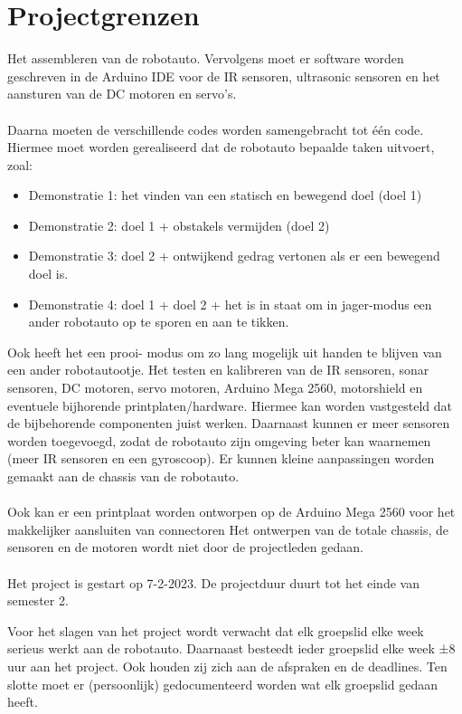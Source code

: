 \section{Projectgrenzen}
Het assembleren van de robotauto. Vervolgens moet er software worden geschreven in de Arduino IDE voor de IR sensoren, ultrasonic sensoren en het aansturen van de DC motoren en servo’s.
\\\\
Daarna moeten de verschillende codes worden samengebracht tot één code. Hiermee moet worden gerealiseerd dat de robotauto bepaalde taken uitvoert, zoal:

\begin{itemize}
    \item Demonstratie 1: het vinden van een statisch en bewegend doel (doel 1)
    \item Demonstratie 2: doel 1 + obstakels vermijden (doel 2)
    \item Demonstratie 3: doel 2 + ontwijkend gedrag vertonen als er een bewegend doel is.
    \item Demonstratie 4: doel 1 + doel 2 + het is in staat om in jager-modus een ander robotauto op te sporen en aan te tikken.
\end{itemize}

Ook heeft het een prooi- modus om zo lang mogelijk uit handen te blijven van een ander robotautootje.
Het testen en kalibreren van de IR sensoren, sonar sensoren, DC motoren, servo motoren, Arduino Mega 2560, motorshield en eventuele bijhorende printplaten/hardware. Hiermee kan worden vastgesteld dat de bijbehorende componenten juist werken. Daarnaast kunnen er meer sensoren worden toegevoegd, zodat de robotauto zijn omgeving beter kan waarnemen (meer IR sensoren en een gyroscoop). Er kunnen kleine aanpassingen worden gemaakt aan de chassis van de robotauto.
\\\\
Ook kan er een printplaat worden ontworpen op de Arduino Mega 2560 voor het makkelijker aansluiten van connectoren
Het ontwerpen van de totale chassis, de sensoren en de motoren wordt niet door de projectleden gedaan.
\\\\
Het project is gestart op 7-2-2023. De projectduur duurt tot het einde van semester 2.

Voor het slagen van het project wordt verwacht dat elk groepslid elke week serieus werkt aan de robotauto. Daarnaast besteedt ieder groepslid elke week ±8 uur aan het project. Ook houden zij zich aan de afspraken en de deadlines. Ten slotte moet er (persoonlijk) gedocumenteerd worden wat elk groepslid gedaan heeft.
